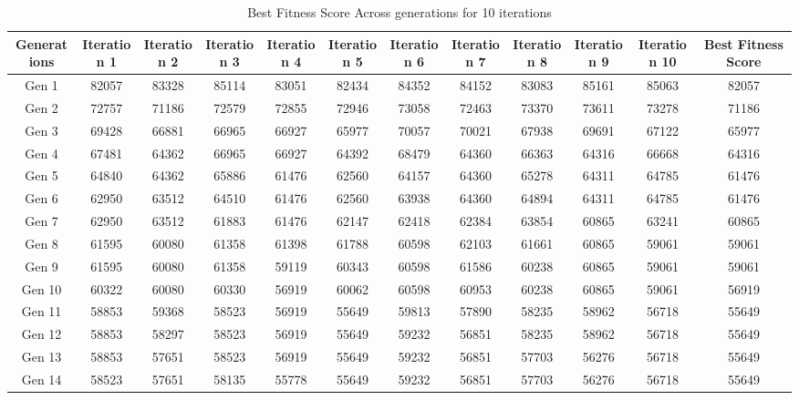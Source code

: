 \documentclass[12pt]{article}
\begin{document}
\begin{table}[h]
    \centering
    \caption{Best Fitness Score Across generations for 10 iterations}
    \label{tab:fitness_scores}
    \begin{adjustbox}{max width=0.7\textwidth} %
        \begin{tabular}{*{12}{c}}
            \toprule
            Generations & Iteration 1 & Iteration 2 & Iteration 3 & Iteration 4 & Iteration 5 & Iteration 6 & Iteration 7 & Iteration 8 & Iteration 9 & Iteration 10 & Best Fitness Score \\
            \midrule
            Gen 1 & 82057 & 83328 & 85114 & 83051 & 82434 & 84352 & 84152 & 83083 & 85161 & 85063 & 82057 \\
            Gen 2 & 72757 & 71186 & 72579 & 72855 & 72946 & 73058 & 72463 & 73370 & 73611 & 73278 & 71186 \\
            Gen 3 & 69428 & 66881 & 66965 & 66927 & 65977 & 70057 & 70021 & 67938 & 69691 & 67122 & 65977 \\
            Gen 4 & 67481 & 64362 & 66965 & 66927 & 64392 & 68479 & 64360 & 66363 & 64316 & 66668 & 64316 \\
            Gen 5 & 64840 & 64362 & 65886 & 61476 & 62560 & 64157 & 64360 & 65278 & 64311 & 64785 & 61476 \\
            Gen 6 & 62950 & 63512 & 64510 & 61476 & 62560 & 63938 & 64360 & 64894 & 64311 & 64785 & 61476 \\
            Gen 7 & 62950 & 63512 & 61883 & 61476 & 62147 & 62418 & 62384 & 63854 & 60865 & 63241 & 60865 \\
            Gen 8 & 61595 & 60080 & 61358 & 61398 & 61788 & 60598 & 62103 & 61661 & 60865 & 59061 & 59061 \\
            Gen 9 & 61595 & 60080 & 61358 & 59119 & 60343 & 60598 & 61586 & 60238 & 60865 & 59061 & 59061 \\
            Gen 10 & 60322 & 60080 & 60330 & 56919 & 60062 & 60598 & 60953 & 60238 & 60865 & 59061 & 56919 \\
            Gen 11 & 58853 & 59368 & 58523 & 56919 & 55649 & 59813 & 57890 & 58235 & 58962 & 56718 & 55649 \\
            Gen 12 & 58853 & 58297 & 58523 & 56919 & 55649 & 59232 & 56851 & 58235 & 58962 & 56718 & 55649 \\
            Gen 13 & 58853 & 57651 & 58523 & 56919 & 55649 & 59232 & 56851 & 57703 & 56276 & 56718 & 55649 \\
            Gen 14 & 58523 & 57651 & 58135 & 55778 & 55649 & 59232 & 56851 & 57703 & 56276 & 56718 & 55649 \\

\end{tabular}
\end{adjustbox}
\end{table}
\end{document}

